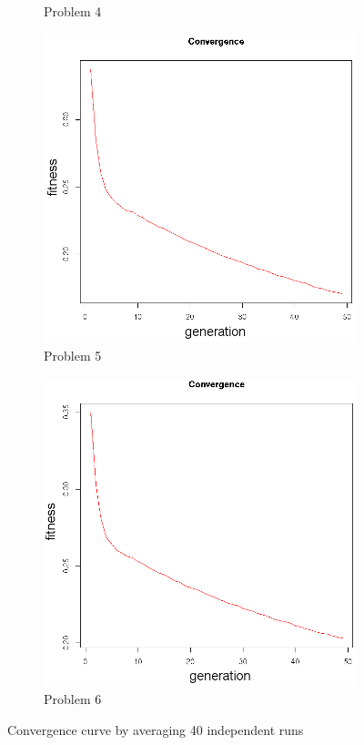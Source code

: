 \begin{figure}[!h]
\begin{subfigure}{0.3\textwidth}
	   \caption{Problem 4}
   \end{subfigure}
      \begin{subfigure}{0.3\textwidth}
       \includegraphics[width=\textwidth]{pics/convergence5.png}
	   \caption{Problem 5}
   \end{subfigure}
      \begin{subfigure}{0.3\textwidth}
       \includegraphics[width=\textwidth]{pics/convergence6.png}
	   \caption{Problem 6}
   \end{subfigure}
   \caption{Convergence curve by averaging 40 independent runs}
   \label{fig:convergence}
\end{figure}


